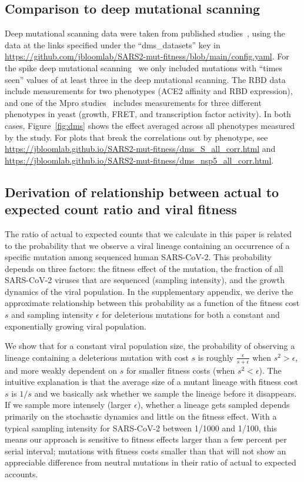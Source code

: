 \documentclass[9pt,twocolumn,twoside]{gsajnl_modified}
\begin{document}
{\subsection{Comparison to deep mutational scanning}
Deep mutational scanning data were taken from published studies~\citep{dadonaite2022pseudovirus,starr2022deep,flynn2022,iketani2022functional}, using the data at the links specified under the ``dms\_datasets'' key in \url{https://github.com/jbloomlab/SARS2-mut-fitness/blob/main/config.yaml}.
For the spike deep mutational scanning~\citep{dadonaite2022pseudovirus} we only included mutations with ``times seen'' values of at least three in the deep mutational scanning.
The RBD data~\citep{starr2022deep} include measurements for two phenotypes (ACE2 affinity and RBD expression), and one of the Mpro studies~\citep{flynn2022} includes measurements for three different phenotypes in yeast (growth, FRET, and transcription factor activity).
In both cases, Figure~\ref{fig:dms} shows the effect averaged across all phenotypes measured by the study.
For plots that break the correlations out by phenotype, see \url{https://jbloomlab.github.io/SARS2-mut-fitness/dms_S_all_corr.html} and \url{https://jbloomlab.github.io/SARS2-mut-fitness/dms_nsp5_all_corr.html}.

\subsection{Derivation of relationship between actual to expected count ratio and viral fitness}
The ratio of actual to expected counts that we calculate in this paper is related to the probability that we observe a viral lineage containing an occurrence of a specific mutation among sequenced human SARS-CoV-2.
This probability depends on three factors: the fitness effect of the mutation, the fraction of all SARS-CoV-2 viruses that are sequenced (sampling intensity), and the growth dynamics of the viral population.
In the supplementary appendix, we derive the approximate relationship between this probability as a function of the fitness cost $s$ and sampling intensity $\epsilon$ for deleterious mutations for both a constant and exponentially growing viral population.

We show that for a constant viral population size, the probability of observing a lineage containing a deleterious mutation with cost $s$ is roughly $\frac{\epsilon}{s + \epsilon}$ when $s^2 > \epsilon$, and more weakly dependent on $s$ for smaller fitness costs (when $s^2 < \epsilon$).
The intuitive explanation is that the average size of a mutant lineage with fitness cost $s$ is $1/s$ and we basically ask whether we sample the lineage before it disappears.
If we sample more intensely (larger $\epsilon$), whether a lineage gets sampled depends primarily on the stochastic dynamics and little on the fitness effect.
With a typical sampling intensity for SARS-CoV-2 between 1/1000 and 1/100, this means our approach is sensitive to fitness effects larger than a few percent per serial interval; mutations with fitness costs smaller than that will not show an appreciable difference from neutral mutations in their ratio of actual to expected accounts.

}
\end{document}
